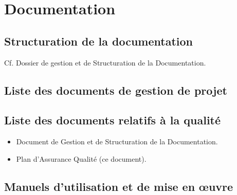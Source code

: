 \section{Documentation}

\subsection{Structuration de la documentation}

Cf. Dossier de gestion et de Structuration de la Documentation.

\subsection{Liste des documents de gestion de projet}


\subsection{Liste des documents relatifs à la qualité}

\begin{itemize}
    \item Document de Gestion et de Structuration de la Documentation.
    \item Plan d'Assurance Qualité (ce document).
\end{itemize}

\subsection{Manuels d'utilisation et de mise en \oe{}uvre}


